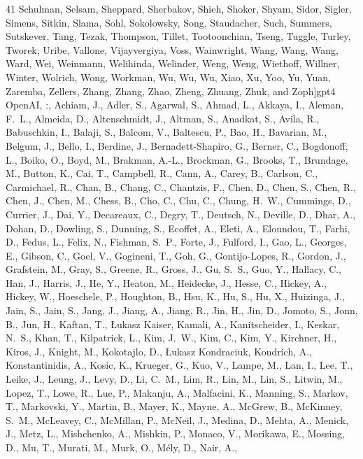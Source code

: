 \documentclass{article}
\theoremstyle{plain}
\theoremstyle{definition}
\theoremstyle{remark}
\begin{document}
\begin{thebibliography}{41}
  Schulman, Selsam, Sheppard, Sherbakov, Shieh, Shoker, Shyam, Sidor, Sigler,
  Simens, Sitkin, Slama, Sohl, Sokolowsky, Song, Staudacher, Such, Summers,
  Sutskever, Tang, Tezak, Thompson, Tillet, Tootoonchian, Tseng, Tuggle,
  Turley, Tworek, Uribe, Vallone, Vijayvergiya, Voss, Wainwright, Wang, Wang,
  Wang, Ward, Wei, Weinmann, Welihinda, Welinder, Weng, Weng, Wiethoff,
  Willner, Winter, Wolrich, Wong, Workman, Wu, Wu, Wu, Xiao, Xu, Yoo, Yu, Yuan,
  Zaremba, Zellers, Zhang, Zhang, Zhao, Zheng, Zhuang, Zhuk, and Zoph]{gpt4}
OpenAI, :, Achiam, J., Adler, S., Agarwal, S., Ahmad, L., Akkaya, I., Aleman,
  F.~L., Almeida, D., Altenschmidt, J., Altman, S., Anadkat, S., Avila, R.,
  Babuschkin, I., Balaji, S., Balcom, V., Baltescu, P., Bao, H., Bavarian, M.,
  Belgum, J., Bello, I., Berdine, J., Bernadett-Shapiro, G., Berner, C.,
  Bogdonoff, L., Boiko, O., Boyd, M., Brakman, A.-L., Brockman, G., Brooks, T.,
  Brundage, M., Button, K., Cai, T., Campbell, R., Cann, A., Carey, B.,
  Carlson, C., Carmichael, R., Chan, B., Chang, C., Chantzis, F., Chen, D.,
  Chen, S., Chen, R., Chen, J., Chen, M., Chess, B., Cho, C., Chu, C., Chung,
  H.~W., Cummings, D., Currier, J., Dai, Y., Decareaux, C., Degry, T., Deutsch,
  N., Deville, D., Dhar, A., Dohan, D., Dowling, S., Dunning, S., Ecoffet, A.,
  Eleti, A., Eloundou, T., Farhi, D., Fedus, L., Felix, N., Fishman, S.~P.,
  Forte, J., Fulford, I., Gao, L., Georges, E., Gibson, C., Goel, V., Gogineni,
  T., Goh, G., Gontijo-Lopes, R., Gordon, J., Grafstein, M., Gray, S., Greene,
  R., Gross, J., Gu, S.~S., Guo, Y., Hallacy, C., Han, J., Harris, J., He, Y.,
  Heaton, M., Heidecke, J., Hesse, C., Hickey, A., Hickey, W., Hoeschele, P.,
  Houghton, B., Hsu, K., Hu, S., Hu, X., Huizinga, J., Jain, S., Jain, S.,
  Jang, J., Jiang, A., Jiang, R., Jin, H., Jin, D., Jomoto, S., Jonn, B., Jun,
  H., Kaftan, T., Łukasz Kaiser, Kamali, A., Kanitscheider, I., Keskar, N.~S.,
  Khan, T., Kilpatrick, L., Kim, J.~W., Kim, C., Kim, Y., Kirchner, H., Kiros,
  J., Knight, M., Kokotajlo, D., Łukasz Kondraciuk, Kondrich, A.,
  Konstantinidis, A., Kosic, K., Krueger, G., Kuo, V., Lampe, M., Lan, I., Lee,
  T., Leike, J., Leung, J., Levy, D., Li, C.~M., Lim, R., Lin, M., Lin, S.,
  Litwin, M., Lopez, T., Lowe, R., Lue, P., Makanju, A., Malfacini, K.,
  Manning, S., Markov, T., Markovski, Y., Martin, B., Mayer, K., Mayne, A.,
  McGrew, B., McKinney, S.~M., McLeavey, C., McMillan, P., McNeil, J., Medina,
  D., Mehta, A., Menick, J., Metz, L., Mishchenko, A., Mishkin, P., Monaco, V.,
  Morikawa, E., Mossing, D., Mu, T., Murati, M., Murk, O., Mély, D., Nair, A.,

\end{thebibliography}
\end{document}
